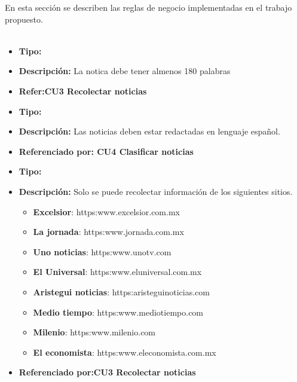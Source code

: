 

En esta sección se describen las reglas de negocio implementadas en el trabajo propuesto.\\\\
\begin{itemize}
  \item \textbf{Tipo:}  
  \item \textbf{Descripción:}  La notica debe tener almenos 180 palabras
  \item \textbf{Refer:CU3 Recolectar noticias} 
\end{itemize}


\begin{itemize}
  \item \textbf{Tipo:}  
  \item \textbf{Descripción:} Las noticias deben estar redactadas en lenguaje español.
  \item \textbf{Referenciado por: CU4 Clasificar noticias}  \\
\end{itemize}

\begin{itemize}
  \item \textbf{Tipo:}  
  \item \textbf{Descripción:} Solo se puede recolectar información de los siguientes sitios.\\

  \begin{itemize}

    \item \textbf{Excelsior}: https:\/\/www.excelsior.com.mx
    \item \textbf{La jornada}: https:\/\/www.jornada.com.mx
    \item \textbf{Uno noticias}: https:\/\/www.unotv.com
    \item \textbf{El Universal}: https:\/\/www.eluniversal.com.mx
    \item \textbf{Aristegui noticias}: https:\/\/aristeguinoticias.com
    \item \textbf{Medio tiempo}: https:\/\/www.mediotiempo.com
    \item \textbf{Milenio}: https:\/\/www.milenio.com 
    \item \textbf{El economista}: https:\/\/www.eleconomista.com.mx

  \end{itemize} 
  \item \textbf{Referenciado por:CU3 Recolectar noticias}  \\
\end{itemize}

